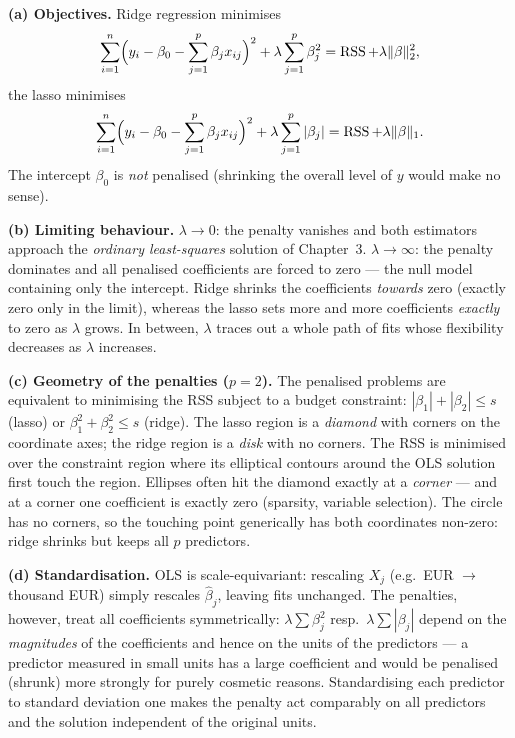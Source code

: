 \documentclass[11pt,a4paper]{article}
\begin{document}
\ifdefined\withsolutions
\begin{solutionbox}
\textbf{(a) Objectives.} Ridge regression minimises
\[
\sum_{i=1}^{n}\Bigl(y_i-\beta_0-\sum_{j=1}^{p}\beta_j x_{ij}\Bigr)^{2}
+\lambda\sum_{j=1}^{p}\beta_j^{2}
=\operatorname{RSS}+\lambda\|\beta\|_2^2 ,
\]
the lasso minimises
\[
\sum_{i=1}^{n}\Bigl(y_i-\beta_0-\sum_{j=1}^{p}\beta_j x_{ij}\Bigr)^{2}
+\lambda\sum_{j=1}^{p}|\beta_j|
=\operatorname{RSS}+\lambda\|\beta\|_1 .
\]
The intercept $\beta_0$ is \emph{not} penalised (shrinking the overall level of $y$ would
make no sense).

\medskip
\textbf{(b) Limiting behaviour.}
$\lambda\to 0$: the penalty vanishes and both estimators approach the \emph{ordinary
least-squares} solution of Chapter~3.
$\lambda\to\infty$: the penalty dominates and all penalised coefficients are forced to
zero --- the null model containing only the intercept. Ridge shrinks the coefficients
\emph{towards} zero (exactly zero only in the limit), whereas the lasso sets more and more
coefficients \emph{exactly} to zero as $\lambda$ grows. In between, $\lambda$ traces out a
whole path of fits whose flexibility decreases as $\lambda$ increases.

\medskip
\textbf{(c) Geometry of the penalties ($p=2$).}
The penalised problems are equivalent to minimising the RSS subject to a budget
constraint: $|\beta_1|+|\beta_2|\le s$ (lasso) or $\beta_1^2+\beta_2^2\le s$ (ridge).
The lasso region is a \emph{diamond} with corners on the coordinate axes; the ridge region
is a \emph{disk} with no corners. The RSS is minimised over the constraint region where
its elliptical contours around the OLS solution first touch the region. Ellipses often hit
the diamond exactly at a \emph{corner} --- and at a corner one coefficient is exactly zero
(sparsity, variable selection). The circle has no corners, so the touching point generically
has both coordinates non-zero: ridge shrinks but keeps all $p$ predictors.

\medskip
\textbf{(d) Standardisation.}
OLS is scale-equivariant: rescaling $X_j$ (e.g.\ EUR $\to$ thousand EUR) simply rescales
$\hat{\beta}_j$, leaving fits unchanged. The penalties, however, treat all coefficients
symmetrically: $\lambda\sum\beta_j^2$ resp.\ $\lambda\sum|\beta_j|$ depend on the
\emph{magnitudes} of the coefficients and hence on the units of the predictors --- a
predictor measured in small units has a large coefficient and would be penalised
(shrunk) more strongly for purely cosmetic reasons. Standardising each predictor to
standard deviation one makes the penalty act comparably on all predictors and the solution
independent of the original units.


\end{solutionbox}
\end{document}
